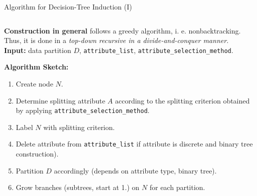 \begin{frame}{Algorithm for Decision-Tree Induction (I)}
	\begin{columns}
		\begin{column}{0.75\textwidth}
			\textbf{Construction in general} follows a greedy algorithm,
			i. e. nonbacktracking. Thus, it is done in a \textit{top-down recursive in a
				divide-and-conquer manner}.\\\medskip
			\textbf{Input:} data partition $D$, \texttt{attribute\_list}, \texttt{attribute\_selection\_method}.\\\medskip

			\textbf{Algorithm Sketch:}
			\begin{enumerate}
				\item Create node $N$.
				\item Determine splitting attribute $A$ according to the splitting criterion
				      obtained by applying \texttt{attribute\_selection\_method}.
				\item Label $N$ with splitting criterion.
				\item Delete attribute from \texttt{attribute\_list} if attribute is discrete and binary tree construction).
				\item Partition $D$ accordingly (depends on attribute type, binary tree).
				\item Grow branches (subtrees, start at 1.) on $N$ for each partition.
			\end{enumerate}



\end{column}
\end{columns}
\end{frame}
